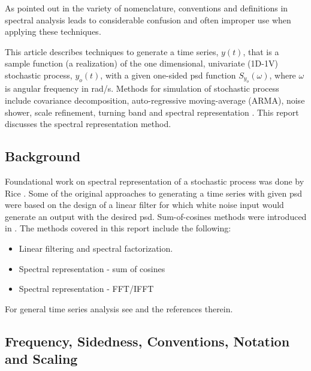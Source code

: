 \documentclass[journal]{IEEEtran}
\begin{document}
As pointed out in \cite{barbour15normalization} the variety of nomenclature, conventions and definitions in spectral analysis leads to considerable confusion and often improper use when applying these techniques.

This article describes techniques to generate a time series, $y(t)$, that is a sample function (a realization) of the one dimensional, univariate (1D-1V) stochastic process, $y_o(t)$, with a given one-sided \ac{psd} function $S_{y_{o}}(\omega)$, where $\omega$ is angular frequency in \unit[]{rad/s}.  %
Methods for simulation of stochastic process include covariance decomposition, auto-regressive moving-average (ARMA), noise shower, scale refinement, turning band and spectral representation \cite{cao00simulation}.  This report discusses the spectral representation method.


\subsection{Background}
Foundational work on spectral representation of a stochastic process was done by
 Rice \cite{rice44mathematical1,rice45mathematical2}.  Some of the original approaches to generating a time series with given \ac{psd} were based on the design of a linear filter for which white noise input would generate an output with the desired \ac{psd}.  Sum-of-cosines methods were introduced in \cite{borgman69ocean, shinozuka72monte}.  The methods covered in this report include the following:
\begin{itemize}
\item Linear filtering and spectral factorization.
\item Spectral representation - sum of cosines
\item Spectral representation - FFT/IFFT
\end{itemize}
\noindent
For general time series analysis see \cite{marchal15notes} and the references therein.

\subsection{Frequency, Sidedness, Conventions, Notation and Scaling}
\end{document}
